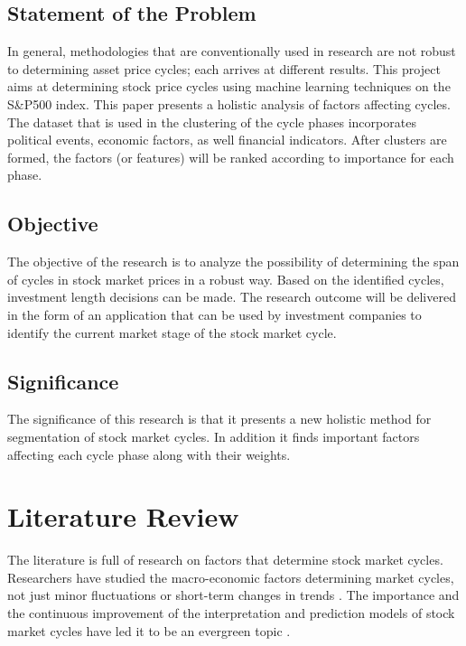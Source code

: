 \documentclass[]{book}
\begin{document}
\hypertarget{statement-of-the-problem}{%
\section{Statement of the Problem}\label{statement-of-the-problem}}

In general, methodologies that are conventionally used in research are not robust to determining asset price cycles; each arrives at different results. This project aims at determining stock price cycles using machine learning techniques on the S\&P500 index. This paper presents a holistic analysis of factors affecting cycles. The dataset that is used in the clustering of the cycle phases incorporates political events, economic factors, as well financial indicators. After clusters are formed, the factors (or features) will be ranked according to importance for each phase.

\hypertarget{objective}{%
\section{Objective}\label{objective}}

The objective of the research is to analyze the possibility of determining the span of cycles in stock market prices in a robust way. Based on the identified cycles, investment length decisions can be made.
The research outcome will be delivered in the form of an application that can be used by investment companies to identify the current market stage of the stock market cycle.

\hypertarget{significance}{%
\section{Significance}\label{significance}}

The significance of this research is that it presents a new holistic method for segmentation of stock market cycles. In addition it finds important factors affecting each cycle phase along with their weights.

\hypertarget{litrev}{%
\chapter{Literature Review}\label{litrev}}

The literature is full of research on factors that determine stock market cycles. Researchers have studied the macro-economic factors determining market cycles, not just minor fluctuations or short-term changes in trends \citep{bosworth1975stock}. The importance and the continuous improvement of the interpretation and prediction models of stock market cycles have led it to be an evergreen topic \citep{jareno2019macroeconomic}.
\end{document}
